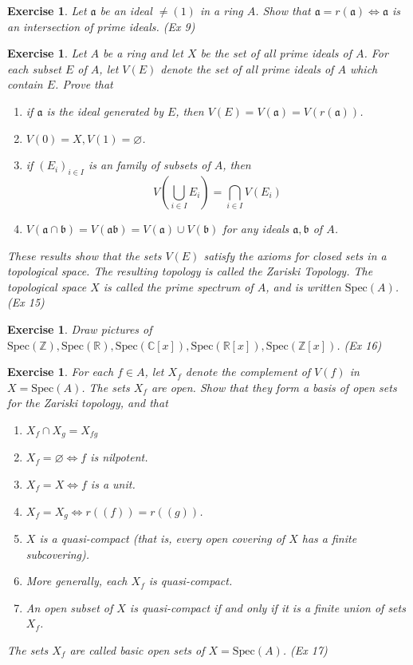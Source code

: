 \documentclass[]{report}
\newtheorem{exercise}[theorem]{Exercise}
\begin{document}
\begin{exercise}
    Let $\mathfrak{a}$ be an ideal $\neq (1)$ in a ring $A$. Show that $\mathfrak{a} = r(\mathfrak{a}) \Leftrightarrow \mathfrak{a}$ is an intersection of prime ideals. (Ex 9)
\end{exercise} 

\begin{exercise}
    Let $A$ be a ring and let $X$ be the set of all prime ideals of $A$. For each subset $E$ of $A$, let $V(E)$ denote the set of all prime ideals of $A$ which contain $E$. Prove that
    \begin{enumerate}
        \item if $\mathfrak{a}$ is the ideal generated by $E$, then $V(E) = V(\mathfrak{a}) = V(r(\mathfrak{a}))$.
        \item $V(0) = X, V(1) = \varnothing$.
        \item if $(E_i)_{i\in I}$ is an family of subsets of $A$, then
            $$V(\bigcup_{i\in I} E_i) = \bigcap_{i\in I} V(E_i)$$
        \item $V(\mathfrak{a\cap b}) = V(\mathfrak{ab}) = V(\mathfrak{a}) \cup V(\mathfrak{b})$ for any ideals $\mathfrak{a, b}$ of $A$. 
    \end{enumerate}
    These results show that the sets $V(E)$ satisfy the axioms for closed sets in a topological space. The resulting topology is called the Zariski Topology. The topological space $X$ is called the prime spectrum of $A$, and is written $\text{Spec}(A)$. (Ex 15)
\end{exercise}

\begin{exercise}
    Draw pictures of $\text{Spec}(\mathbb{Z}), \text{Spec}(\mathbb{R}), \text{Spec}(\mathbb{C}[x]), \text{Spec}(\mathbb{R}[x]), \text{Spec}(\mathbb{Z}[x])$. (Ex 16)
\end{exercise}
       
\begin{exercise}
    For each $f\in A$, let $X_f$ denote the complement of $V(f)$ in $X = \text{Spec}(A)$. The sets $X_f$ are open. Show that they form a basis of open sets for the Zariski topology, and that
    \begin{enumerate}
        \item $X_f \cap X_g = X_{fg}$
        \item $X_f = \varnothing \Leftrightarrow f$ is nilpotent.
        \item $X_f = X \Leftrightarrow f$ is a unit.
        \item $X_f = X_g \Leftrightarrow r((f)) = r((g))$.
        \item $X$ is a quasi-compact (that is, every open covering of $X$ has a finite subcovering).
        \item More generally, each $X_f$ is quasi-compact.
        \item An open subset of $X$ is quasi-compact if and only if it is a finite union of sets $X_f$. 
    \end{enumerate}
    The sets $X_f$ are called basic open sets of $X = \text{Spec}(A)$. (Ex 17)
\end{exercise}
\end{document}
